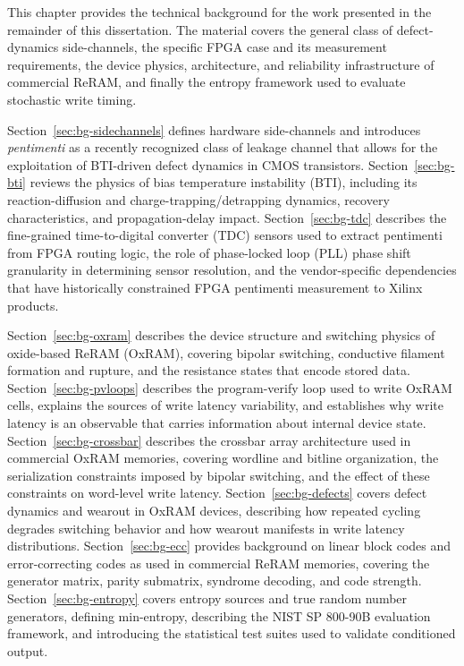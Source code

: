 This chapter provides the technical background for the work presented in
the remainder of this dissertation. The material covers the general
class of defect-dynamics side-channels, the specific FPGA case and its
measurement requirements, the device physics, architecture, and
reliability infrastructure of commercial ReRAM, and finally the entropy
framework used to evaluate stochastic write timing.

Section~\ref{sec:bg-sidechannels} defines hardware side-channels and
introduces \emph{pentimenti} as a recently recognized class of leakage
channel that allows for the exploitation of BTI-driven defect dynamics
in CMOS transistors. Section~\ref{sec:bg-bti} reviews the physics of
bias temperature instability (BTI), including its reaction-diffusion and
charge-trapping/detrapping dynamics, recovery characteristics, and
propagation-delay impact. Section~\ref{sec:bg-tdc} describes the
fine-grained time-to-digital converter (TDC) sensors used to extract
pentimenti from FPGA routing logic, the role of phase-locked loop (PLL)
phase shift granularity in determining sensor resolution, and the
vendor-specific dependencies that have historically constrained FPGA
pentimenti measurement to Xilinx products.

Section~\ref{sec:bg-oxram} describes the device structure and switching
physics of oxide-based ReRAM (OxRAM), covering bipolar switching,
conductive filament formation and rupture, and the resistance states
that encode stored data. Section~\ref{sec:bg-pvloops} describes the
program-verify loop used to write OxRAM cells, explains the sources of
write latency variability, and establishes why write latency is an
observable that carries information about internal device state.
Section~\ref{sec:bg-crossbar} describes the crossbar array architecture
used in commercial OxRAM memories, covering wordline and bitline
organization, the serialization constraints imposed by bipolar
switching, and the effect of these constraints on word-level write
latency. Section~\ref{sec:bg-defects} covers defect dynamics and wearout
in OxRAM devices, describing how repeated cycling degrades switching
behavior and how wearout manifests in write latency distributions.
Section~\ref{sec:bg-ecc} provides background on linear block codes and
error-correcting codes as used in commercial ReRAM memories, covering
the generator matrix, parity submatrix, syndrome decoding, and code
strength. Section~\ref{sec:bg-entropy} covers entropy sources and true
random number generators, defining min-entropy, describing the NIST SP
800-90B evaluation framework, and introducing the statistical test
suites used to validate conditioned output.